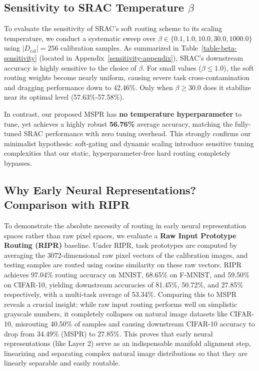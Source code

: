 \documentclass{article}
\theoremstyle{plain}
\theoremstyle{definition}
\theoremstyle{remark}
\begin{document}
\subsection{Sensitivity to SRAC Temperature \texorpdfstring{$\beta$}{beta}}
To evaluate the sensitivity of SRAC's soft routing scheme to its scaling temperature, we conduct a systematic sweep over $\beta \in \{0.1, 1.0, 10.0, 30.0, 1000.0\}$ using $|D_{\text{cal}}| = 256$ calibration samples. As summarized in Table~\ref{table-beta-sensitivity} (located in Appendix~\ref{sensitivity-appendix}), SRAC's downstream accuracy is highly sensitive to the choice of $\beta$. For small values ($\beta \le 1.0$), the soft routing weights become nearly uniform, causing severe task cross-contamination and dragging performance down to 42.46\%. Only when $\beta \ge 30.0$ does it stabilize near its optimal level (57.63\%-57.58\%). 

In contrast, our proposed MSPR has \textbf{no temperature hyperparameter} to tune, yet achieves a highly robust \textbf{56.76\%} average accuracy, matching the fully-tuned SRAC performance with zero tuning overhead. This strongly confirms our minimalist hypothesis: soft-gating and dynamic scaling introduce sensitive tuning complexities that our static, hyperparameter-free hard routing completely bypasses.

\subsection{Why Early Neural Representations? Comparison with RIPR}
To demonstrate the absolute necessity of routing in early neural representation spaces rather than raw pixel spaces, we evaluate a \textbf{Raw Input Prototype Routing (RIPR)} baseline. Under RIPR, task prototypes are computed by averaging the 3072-dimensional raw pixel vectors of the calibration images, and testing samples are routed using cosine similarity on these raw vectors. RIPR achieves 97.04\% routing accuracy on MNIST, 68.65\% on F-MNIST, and 59.50\% on CIFAR-10, yielding downstream accuracies of 81.45\%, 50.72\%, and 27.85\% respectively, with a multi-task average of 53.34\%. Comparing this to MSPR reveals a crucial insight: while raw input routing performs well on simplistic grayscale numbers, it completely collapses on natural image datasets like CIFAR-10, misrouting 40.50\% of samples and causing downstream CIFAR-10 accuracy to drop from 34.49\% (MSPR) to 27.85\%. This proves that early neural representations (like Layer 2) serve as an indispensable manifold alignment step, linearizing and separating complex natural image distributions so that they are linearly separable and easily routable.
\end{document}

